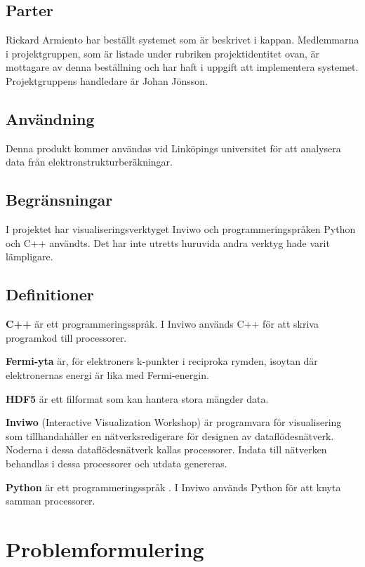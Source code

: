\documentclass[a4paper,12pt]{article}
\begin{document}
\subsection{Parter}
Rickard Armiento har beställt systemet som är beskrivet i kappan. Medlemmarna i projektgruppen, som är listade under rubriken projektidentitet ovan, är mottagare av denna beställning och har haft i uppgift att implementera systemet. Projektgruppens handledare är Johan Jönsson.


\subsection{Användning}
Denna produkt kommer användas vid Linköpings universitet för att analysera data från elektronstrukturberäkningar.

\subsection{Begränsningar}
I projektet har visualiseringsverktyget Inviwo och
programmeringspråken Python och C++ användts. Det har inte utretts huruvida andra verktyg hade varit lämpligare.

\subsection{Definitioner}

\textbf{C++} är ett programmeringsspråk.
\cite{C++}
\newline
I Inviwo används C++ för att skriva programkod till
processorer.

\textbf{Fermi-yta} är, för elektroners k-punkter i reciproka rymden, isoytan där elektronernas energi är lika med Fermi-energin.
\cite{Fermi-yta}

\textbf{HDF5} är ett filformat som kan hantera stora mängder data.
\cite{hdf5}

\textbf{Inviwo} (Interactive Visualization Workshop) är programvara
för visualisering som tillhandahåller en nätverksredigerare för
designen av dataflödesnätverk. Noderna i dessa dataflödesnätverk
kallas processorer. Indata till nätverken behandlas i dessa
processorer och utdata genereras.
\cite{Inviwo}

\textbf{Python} är ett programmeringsspråk \cite{Python}. I Inviwo används Python för att knyta samman processorer.


\section{Problemformulering}
\label{ch:problemformulering}
\end{document}
